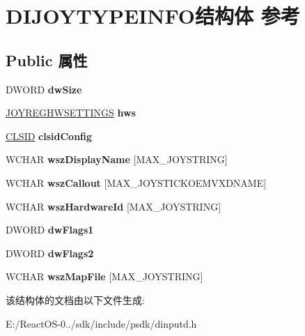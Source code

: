 \hypertarget{struct_d_i_j_o_y_t_y_p_e_i_n_f_o}{}\section{D\+I\+J\+O\+Y\+T\+Y\+P\+E\+I\+N\+F\+O结构体 参考}
\label{struct_d_i_j_o_y_t_y_p_e_i_n_f_o}
\subsection*{Public 属性}
\begin{DoxyCompactItemize}
\item 
\mbox{\label{struct_d_i_j_o_y_t_y_p_e_i_n_f_o_a3248147ea4a9431678ecdaf3cbeade89}} 
D\+W\+O\+RD {\bfseries dw\+Size}
\item 
\mbox{\label{struct_d_i_j_o_y_t_y_p_e_i_n_f_o_ab8b87c9da694a82ae06d8ddb085df41f}} 
\hyperlink{structjoyreghwsettings__tag}{J\+O\+Y\+R\+E\+G\+H\+W\+S\+E\+T\+T\+I\+N\+GS} {\bfseries hws}
\item 
\mbox{\label{struct_d_i_j_o_y_t_y_p_e_i_n_f_o_acf2667716306ebf6f051e3601fad15c4}} 
\hyperlink{struct___i_i_d}{C\+L\+S\+ID} {\bfseries clsid\+Config}
\item 
\mbox{\label{struct_d_i_j_o_y_t_y_p_e_i_n_f_o_a4fa64e9705c49937c2ea22f699473900}} 
W\+C\+H\+AR {\bfseries wsz\+Display\+Name} \mbox{[}M\+A\+X\+\_\+\+J\+O\+Y\+S\+T\+R\+I\+NG\mbox{]}
\item 
\mbox{\label{struct_d_i_j_o_y_t_y_p_e_i_n_f_o_a459fd95d00474b59bbdc15431d24fadf}} 
W\+C\+H\+AR {\bfseries wsz\+Callout} \mbox{[}M\+A\+X\+\_\+\+J\+O\+Y\+S\+T\+I\+C\+K\+O\+E\+M\+V\+X\+D\+N\+A\+ME\mbox{]}
\item 
\mbox{\label{struct_d_i_j_o_y_t_y_p_e_i_n_f_o_ab942942fff6586414c19fd9ba1e7ac8d}} 
W\+C\+H\+AR {\bfseries wsz\+Hardware\+Id} \mbox{[}M\+A\+X\+\_\+\+J\+O\+Y\+S\+T\+R\+I\+NG\mbox{]}
\item 
\mbox{\label{struct_d_i_j_o_y_t_y_p_e_i_n_f_o_a761e2a4fc00b080602ceeb927204b0c5}} 
D\+W\+O\+RD {\bfseries dw\+Flags1}
\item 
\mbox{\label{struct_d_i_j_o_y_t_y_p_e_i_n_f_o_a89f46b78e0cd3aef952f7e2aaad6bd4c}} 
D\+W\+O\+RD {\bfseries dw\+Flags2}
\item 
\mbox{\label{struct_d_i_j_o_y_t_y_p_e_i_n_f_o_a92f8d79b11ba18cc42418c8bee71f357}} 
W\+C\+H\+AR {\bfseries wsz\+Map\+File} \mbox{[}M\+A\+X\+\_\+\+J\+O\+Y\+S\+T\+R\+I\+NG\mbox{]}
\end{DoxyCompactItemize}


该结构体的文档由以下文件生成\+:\begin{DoxyCompactItemize}
\item 
E\+:/\+React\+O\+S-\/0../sdk/include/psdk/dinputd.\+h\end{DoxyCompactItemize}
